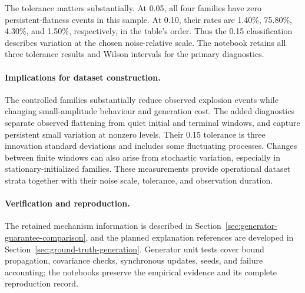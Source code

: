 The tolerance matters substantially. At 0.05, all four families have zero
persistent-flatness events in this sample. At 0.10, their rates are 1.40\%,
75.80\%, 4.30\%, and 1.50\%, respectively, in the table's order.
Thus the 0.15 classification describes variation at the chosen noise-relative
scale. The notebook retains all three tolerance results and Wilson intervals
for the primary diagnostics.


\paragraph{Implications for dataset construction.}
The controlled families substantially reduce observed explosion events while
changing small-amplitude behaviour and generation cost. The added diagnostics
separate observed flattening from quiet initial and terminal windows, and
capture persistent small variation at nonzero levels. Their 0.15 tolerance
is three innovation standard deviations and includes some fluctuating
processes. Changes between finite windows can also arise from stochastic
variation, especially in stationary-initialized families. These measurements
provide operational dataset strata together with their noise scale, tolerance,
and observation duration.

\paragraph{Verification and reproduction.}
The retained mechanism information is described in
Section~\ref{sec:generator-guarantee-comparison}, and the planned explanation
references are developed in Section~\ref{sec:ground-truth-generation}.
Generator unit tests cover bound propagation, covariance checks,
synchronous updates, seeds, and failure accounting; the notebooks preserve
the empirical evidence and its complete reproduction record.
